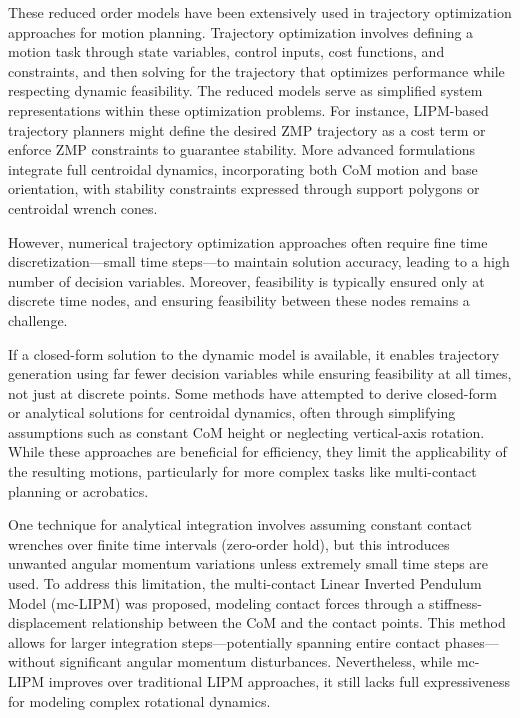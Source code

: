 \documentclass[main.tex]{subfiles}
\begin{document}
These reduced order models have been extensively used in trajectory optimization approaches for motion planning. Trajectory optimization involves defining a motion task through state variables, control inputs, cost functions, and constraints, and then solving for the trajectory that optimizes performance while respecting dynamic feasibility. The reduced models serve as simplified system representations within these optimization problems. For instance, LIPM-based trajectory planners might define the desired ZMP trajectory as a cost term or enforce ZMP constraints to guarantee stability. More advanced formulations integrate full centroidal dynamics, incorporating both CoM motion and base orientation, with stability constraints expressed through support polygons or centroidal wrench cones.

However, numerical trajectory optimization approaches often require fine time discretization—small time steps—to maintain solution accuracy, leading to a high number of decision variables. Moreover, feasibility is typically ensured only at discrete time nodes, and ensuring feasibility between these nodes remains a challenge.

If a closed-form solution to the dynamic model is available, it enables trajectory generation using far fewer decision variables while ensuring feasibility at all times, not just at discrete points. Some methods have attempted to derive closed-form or analytical solutions for centroidal dynamics, often through simplifying assumptions such as constant CoM height or neglecting vertical-axis rotation. While these approaches are beneficial for efficiency, they limit the applicability of the resulting motions, particularly for more complex tasks like multi-contact planning or acrobatics.

One technique for analytical integration involves assuming constant contact wrenches over finite time intervals (zero-order hold), but this introduces unwanted angular momentum variations unless extremely small time steps are used. To address this limitation, the multi-contact Linear Inverted Pendulum Model (mc-LIPM) was proposed, modeling contact forces through a stiffness-displacement relationship between the CoM and the contact points. This method allows for larger integration steps—potentially spanning entire contact phases—without significant angular momentum disturbances. Nevertheless, while mc-LIPM improves over traditional LIPM approaches, it still lacks full expressiveness for modeling complex rotational dynamics.
\end{document}
